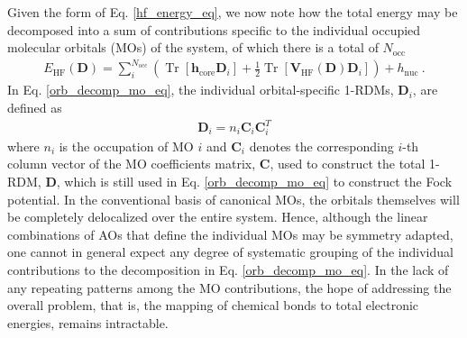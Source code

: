 \documentclass[journal=jctc,manuscript=article]{achemso}
\DeclareMathOperator{\tr}{Tr}
\begin{document}
Given the form of Eq. \ref{hf_energy_eq}, we now note how the total energy may be decomposed into a sum of contributions specific to the individual occupied molecular orbitals (MOs) of the system, of which there is a total of $N_{\text{occ}}$
%
\begin{align}
E_{\text{HF}}(\bm{D}) = \sum^{N_{\text{occ}}}_{i}(\tr[\bm{h}_{\text{core}}\bm{D}_i] + \tfrac{1}{2}\tr[\bm{V}_{\text{HF}}(\bm{D})\bm{D}_i]) + h_{\text{nuc}} \ . \label{orb_decomp_mo_eq}
\end{align}
%
In Eq. \ref{orb_decomp_mo_eq}, the individual orbital-specific 1-RDMs, $\bm{D}_i$, are defined as
%
\begin{align}
\bm{D}_i = n_{i}\bm{C}_{i}\bm{C}^T_{i} \label{orb_spec_1rdm_eq}
\end{align}
%
where $n_i$ is the occupation of MO $i$ and $\bm{C}_i$ denotes the corresponding $i$-th column vector of the MO coefficients matrix, $\bm{C}$, used to construct the total 1-RDM, $\bm{D}$, which is still used in Eq. \ref{orb_decomp_mo_eq} to construct the Fock potential. In the conventional basis of canonical MOs, the orbitals themselves will be completely delocalized over the entire system. Hence, although the linear combinations of AOs that define the individual MOs may be symmetry adapted, one cannot in general expect any degree of systematic grouping of the individual contributions to the decomposition in Eq. \ref{orb_decomp_mo_eq}. In the lack of any repeating patterns among the MO contributions, the hope of addressing the overall problem, that is, the mapping of chemical bonds to total electronic energies, remains intractable.\\
\end{document}
